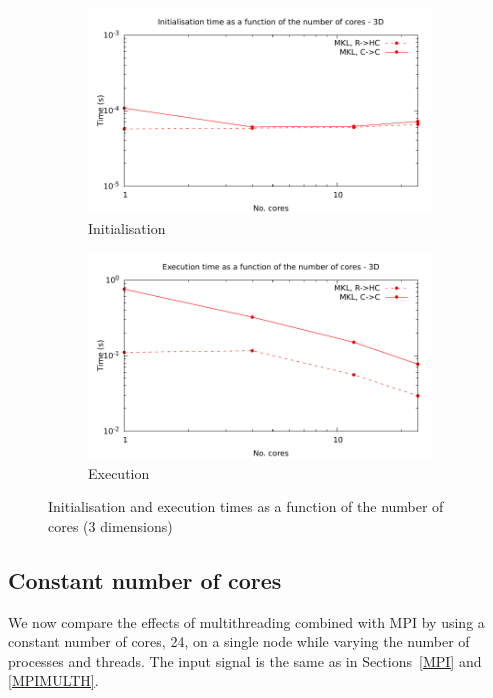 \documentclass[12pt, a4paper]{article} \setlength{\textheight}{24cm}
\begin{document}
\begin{figure}[H]
  \centering
  \begin{subfigure}{.5\textwidth}
    \centering
    \includegraphics[width=.9\linewidth]{graphs/mpi-multh-init-3d.pdf}
    \caption{Initialisation}
    \label{3DMPIMULTHI}
  \end{subfigure}%
  \begin{subfigure}{.5\textwidth}
    \centering
    \includegraphics[width=.9\linewidth]{graphs/mpi-multh-exec-3d.pdf}
    \caption{Execution}
    \label{3DMPIMULTHE}
  \end{subfigure}
  \caption{Initialisation and execution times as a function of the
    number of cores (3 dimensions)}
  \label{3DMPIMULTH}
\end{figure}

\subsection{Constant number of cores}\label{CONST}
We now compare the effects of multithreading combined with MPI by using a
constant number of cores, 24, on a single node while varying the
number of processes and threads. The input signal is the same as in Sections~\ref{MPI} and \ref{MPIMULTH}.
\end{document}
